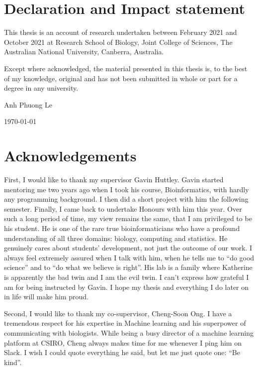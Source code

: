 \chapter*{Declaration and Impact statement}

This thesis is an account of research undertaken between February 2021 and  October 2021 at Research School of Biology, Joint College of Sciences, The Australian National University, Canberra, Australia.

Except where acknowledged, the material presented in this thesis is, to the best of my knowledge, original and has not been submitted in whole or part for a degree in any university.

\vspace{20mm}  %

\large
\hspace{12cm} Anh Phuong Le\par
\hspace{12cm} \today

\normalsize
\chapter*{Acknowledgements}

First, I would like to thank my supervisor Gavin Huttley. Gavin started mentoring me two years ago when I took his course, Bioinformatics, with hardly any programming background. I then did a short project with him the following semester. Finally, I came back to undertake Honours with him this year. Over such a long period of time, my view remains the same, that I am privileged to be his student. He is one of the rare true bioinformaticians who have a profound understanding of all three domains: biology, computing and statistics. He genuinely cares about students' development, not just the outcome of our work. I always feel extremely assured when I talk with him, when he tells me to ``do good science'' and to ``do what we believe is right''. His lab is a family where Katherine is apparently the bad twin and I am the evil twin. I can't express how grateful I am for being instructed by Gavin. I hope my thesis and everything I do later on in life will make him proud.

Second, I would like to thank my co-supervisor, Cheng-Soon Ong. I have a tremendous respect for his expertise in Machine learning and his superpower of communicating with biologists. While being a busy director of a machine learning platform at CSIRO, Cheng always makes time for me whenever I ping him on Slack. I wish I could quote everything he said, but let me just quote one: ``Be kind''.

